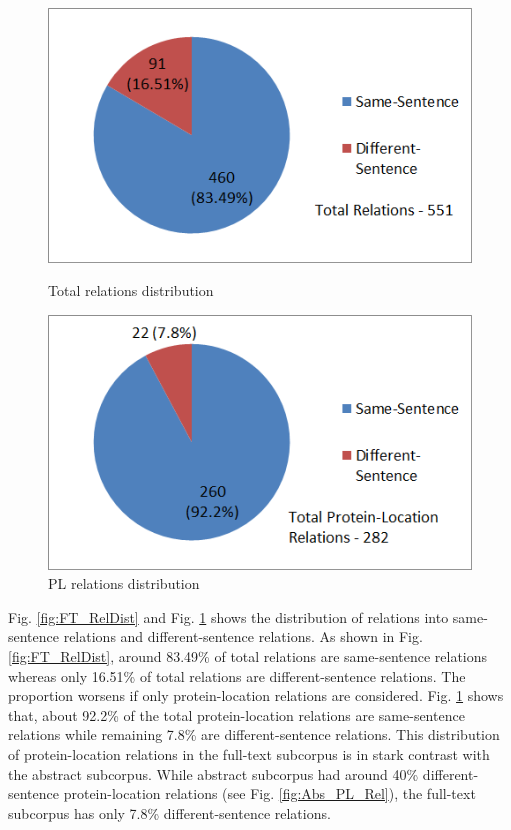 \begin{figure}
\centering
\begin{minipage}{.5\textwidth}
  \centering
  \includegraphics[width=.95\textwidth]{figures/2_FTTotalRelDist.png}
  \caption{Total relations distribution}
  \label{fig:FT_RelDist}
\end{minipage}%
\begin{minipage}{.5\textwidth}
  \centering
  \includegraphics[width=.95\textwidth]{figures/2_FTPLRelDist.png}
  \caption{PL relations distribution}
  \label{fig:FT_PLRelDist}
\end{minipage}
\end{figure}

Fig. \ref{fig:FT_RelDist} and Fig. \ref{fig:FT_PLRelDist} shows the distribution of relations into same-sentence relations and different-sentence relations. As shown in Fig. \ref{fig:FT_RelDist}, around 83.49\% of total relations are same-sentence relations whereas only 16.51\% of total relations are different-sentence relations. The proportion worsens if only protein-location relations are considered. Fig. \ref{fig:FT_PLRelDist} shows that, about 92.2\% of the total protein-location relations are same-sentence relations while remaining 7.8\% are different-sentence relations. This distribution of protein-location relations in the full-text subcorpus is in stark contrast with the abstract subcorpus. While abstract subcorpus had around 40\% different-sentence protein-location relations (see Fig. \ref{fig:Abs_PL_Rel}), the full-text subcorpus has only 7.8\% different-sentence relations.

